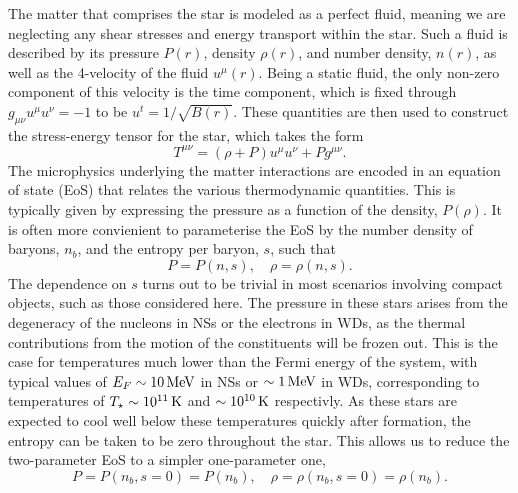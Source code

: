 The matter that comprises the star is modeled as a perfect fluid, meaning we are neglecting any shear stresses and energy transport within the star. Such a fluid is described by its pressure $P(r)$, density $\rho(r)$, and number density, $n(r)$, as well as the 4-velocity of the fluid $u^\mu(r)$. Being a static fluid, the only non-zero component of this velocity is the time component, which is fixed through $g_{\mu\nu}u^\mu u^\nu = -1$ to be $u^t = 1/\sqrt{B(r)}$.
These quantities are then used to construct the stress-energy tensor for the star, which takes the form
\begin{equation}
    T^{\mu\nu} = (\rho + P)u^\mu u^\nu + P g^{\mu\nu}.
\end{equation}
The microphysics underlying the matter interactions are encoded in an equation of state (EoS) that relates the various thermodynamic quantities. This is typically given by expressing the pressure as a function of the density, $P(\rho)$. It is often more convienient to parameterise the EoS by the number density of baryons, $n_b$, and the entropy per baryon, $s$, such that 
\begin{equation}
    P=P(n, s), \quad \rho = \rho(n, s).
\end{equation}
The dependence on $s$ turns out to be trivial in most scenarios involving compact objects, such as those considered here. The pressure in these stars arises from the degeneracy of the nucleons in NSs or the electrons in WDs, as the thermal contributions from the motion of the constituents will be frozen out. This is the case for temperatures much lower than the Fermi energy of the system, with typical values of $E_F \sim 10{\rm \,MeV}$ in NSs or $\sim 1 {\rm \,MeV}$ in WDs, corresponding to temperatures of $T_\star\sim 10^{11}{\rm \,K}$ and $\sim 10^{10}{\rm \,K}$ respectivly. As these stars are expected to cool well below these temperatures quickly after formation, the entropy can be taken to be zero throughout the star. This allows us to reduce the two-parameter EoS to a simpler one-parameter one,
\begin{equation}
    P=P(n_b, s = 0) = P(n_b), \quad \rho = \rho(n_b, s=0) = \rho(n_b).\label{eq:1_param_EoS}
\end{equation} 

